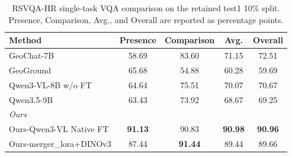 \begin{table}[t]
  \caption{RSVQA-HR single-task VQA comparison on the retained test1 10\% split. Presence, Comparison, Avg., and Overall are reported as percentage points.}
  \label{tab:RSVQA_HR_single_task_vqa_test1}
  \vspace{5pt}
  \centering
  \scriptsize
  \setlength{\tabcolsep}{6pt}
  \renewcommand{\arraystretch}{1.08}
  \begin{tabular}{lcccc}
    \toprule
    Method & Presence & Comparison & Avg. & Overall \\
    \midrule
    GeoChat-7B                         & 58.69          & 83.60          & 71.15          & 72.51          \\
    GeoGround                          & 65.68          & 54.88          & 60.28          & 59.69          \\
    Qwen3-VL-8B w/o FT                  & 64.64          & 75.51          & 70.07          & 70.67          \\
    Qwen3.5-9B                          & 63.43          & 73.92          & 68.67          & 69.25          \\
    \midrule
    \multicolumn{5}{l}{\textit{Ours}} \\
    Ours-Qwen3-VL Native FT            & \textbf{91.13} & 90.83          & \textbf{90.98} & \textbf{90.96} \\
    Ours-merger\_lora+DINOv3           & 87.44          & \textbf{91.44} & 89.44          & 89.66          \\
    \bottomrule
  \end{tabular}
\end{table}
